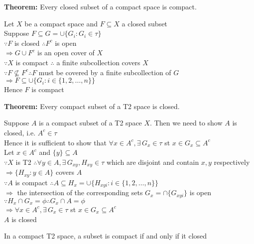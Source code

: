 \documentclass{article}
\begin{document}
\textbf{Theorem:} Every closed subset of a compact space is compact.
\begin{tcolorbox}[colback=lightgray!10,colframe=lightgray!10, fontupper=\linespread{1.5}\selectfont]
	Let $X$ be a compact space and $F \subseteq X$ a closed subset \\
	Suppose $F \subseteq G = \cup \{G_i: G_i \in \tau\}$ \\
	$\because F$ is closed $\therefore F^c$ is open \\
	$\Rightarrow G \cup F^c$ is an open cover of $X$ \\
	$\because X$ is compact $\therefore$ a finite subcollection covers $X$ \\
	$\because F \not\subseteq F^c \therefore F$ must be covered by a finite subcollection of $G$ \\
	$\Rightarrow F \subseteq \cup \{G_i: i \in \{1,2,\dots,n\}\}$ \\
	Hence $F$ is compact
	
\end{tcolorbox}

\textbf{Theorem:} Every compact subset of a T2 space is closed.
\begin{tcolorbox}[colback=lightgray!10,colframe=lightgray!10, fontupper=\linespread{1.5}\selectfont]
	Suppose $A$ is a compact subset of a T2 space $X$. Then we need to show $A$ is closed, i.e. $A^c \in \tau$ \\
	Hence it is sufficient to show that $\forall x \in A^c, \exists \, G_x \in \tau$ st $x \in G_x \subseteq A^c$ \\
	Let $x \in A^c$ and $\{y\} \subseteq A$ \\
	$\because X$ is T2 $\therefore \forall y \in A, \exists \, G_{xy}, H_{xy} \in \tau$ which are disjoint and contain $x,y$ respectively \\
	$\Rightarrow \{H_{xy}: y \in A\}$ covers $A$ \\
	$\because A$ is compact $\therefore A \subseteq H_x = \cup \{H_{xyi}: i \in \{1,2,\dots,n\}\}$ \\
	$\Rightarrow$ the intersection of the corresponding sets $G_x = \cap \{G_{xyi}\}$ is open \\
	$\because H_x \cap G_x = \phi \therefore G_x \cap A = \phi$ \\
	$\Rightarrow \forall x \in A^c, \exists \, G_x \in \tau$ st $x \in G_x \subseteq A^c$ \\
	$A$ is closed
\end{tcolorbox}
In a compact T2 space, a subset is compact if and only if it closed
\end{document}
